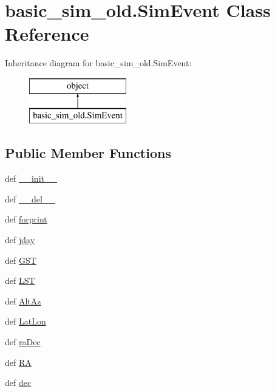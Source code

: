 \hypertarget{classbasic__sim__old_1_1_sim_event}{\section{basic\-\_\-sim\-\_\-old.\-Sim\-Event Class Reference}
\label{classbasic__sim__old_1_1_sim_event}
}
Inheritance diagram for basic\-\_\-sim\-\_\-old.\-Sim\-Event\-:\begin{figure}[H]
\begin{center}
\leavevmode
\includegraphics[height=2.000000cm]{classbasic__sim__old_1_1_sim_event}
\end{center}
\end{figure}
\subsection*{Public Member Functions}
\begin{DoxyCompactItemize}
\item 
def \hyperlink{classbasic__sim__old_1_1_sim_event_aaef4bb94745ed59caf2fa4e59aa2b6e7}{\-\_\-\-\_\-init\-\_\-\-\_\-}
\item 
def \hyperlink{classbasic__sim__old_1_1_sim_event_a02262a28ffb04370abf5968353798354}{\-\_\-\-\_\-del\-\_\-\-\_\-}
\item 
def \hyperlink{classbasic__sim__old_1_1_sim_event_a0e06cb1a31ac729d90b219864a1d327f}{forprint}
\item 
def \hyperlink{classbasic__sim__old_1_1_sim_event_ab455dcbf5fd02e68e8f1b670195c161c}{jday}
\item 
def \hyperlink{classbasic__sim__old_1_1_sim_event_ad59c9f8114aa2f50b7d7301204ca7bbc}{G\-S\-T}
\item 
def \hyperlink{classbasic__sim__old_1_1_sim_event_a5b9ea8c6d9ce5a40a28a3a8eee6a3674}{L\-S\-T}
\item 
def \hyperlink{classbasic__sim__old_1_1_sim_event_ad889b1c098f4b32899232212c551dc3f}{Alt\-Az}
\item 
def \hyperlink{classbasic__sim__old_1_1_sim_event_ac4a235942421c942a7824956d86d0276}{Lat\-Lon}
\item 
def \hyperlink{classbasic__sim__old_1_1_sim_event_a9fa90508863fcdd824388fdfbfd167b0}{ra\-Dec}
\item 
def \hyperlink{classbasic__sim__old_1_1_sim_event_ab3768f5029c64a2361813ad845df2f57}{R\-A}
\item 
def \hyperlink{classbasic__sim__old_1_1_sim_event_a1613d4a9fc11172d53dcfed4a37278af}{dec}
\end{DoxyCompactItemize}
